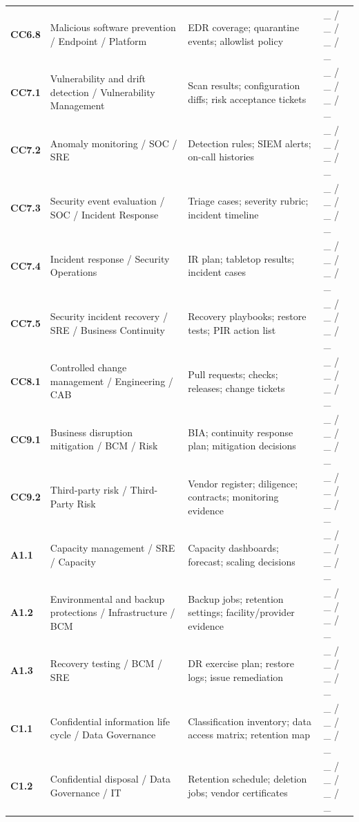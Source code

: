 \documentclass[10pt,oneside]{report}
\begin{document}
\begin{longtable}{@{}p{0.63in}p{2.13in}p{2.28in}p{0.92in}@{}}
\textbf{CC6.8} & Malicious software prevention / Endpoint / Platform & EDR coverage; quarantine events; allowlist policy & \_ / \_ / \_ / \_ \\
\addlinespace[3pt]
\textbf{CC7.1} & Vulnerability and drift detection / Vulnerability Management & Scan results; configuration diffs; risk acceptance tickets & \_ / \_ / \_ / \_ \\
\addlinespace[3pt]
\textbf{CC7.2} & Anomaly monitoring / SOC / SRE & Detection rules; SIEM alerts; on-call histories & \_ / \_ / \_ / \_ \\
\addlinespace[3pt]
\textbf{CC7.3} & Security event evaluation / SOC / Incident Response & Triage cases; severity rubric; incident timeline & \_ / \_ / \_ / \_ \\
\addlinespace[3pt]
\textbf{CC7.4} & Incident response / Security Operations & IR plan; tabletop results; incident cases & \_ / \_ / \_ / \_ \\
\addlinespace[3pt]
\textbf{CC7.5} & Security incident recovery / SRE / Business Continuity & Recovery playbooks; restore tests; PIR action list & \_ / \_ / \_ / \_ \\
\addlinespace[3pt]
\textbf{CC8.1} & Controlled change management / Engineering / CAB & Pull requests; checks; releases; change tickets & \_ / \_ / \_ / \_ \\
\addlinespace[3pt]
\textbf{CC9.1} & Business disruption mitigation / BCM / Risk & BIA; continuity response plan; mitigation decisions & \_ / \_ / \_ / \_ \\
\addlinespace[3pt]
\textbf{CC9.2} & Third-party risk / Third-Party Risk & Vendor register; diligence; contracts; monitoring evidence & \_ / \_ / \_ / \_ \\
\addlinespace[3pt]
\textbf{A1.1} & Capacity management / SRE / Capacity & Capacity dashboards; forecast; scaling decisions & \_ / \_ / \_ / \_ \\
\addlinespace[3pt]
\textbf{A1.2} & Environmental and backup protections / Infrastructure / BCM & Backup jobs; retention settings; facility/provider evidence & \_ / \_ / \_ / \_ \\
\addlinespace[3pt]
\textbf{A1.3} & Recovery testing / BCM / SRE & DR exercise plan; restore logs; issue remediation & \_ / \_ / \_ / \_ \\
\addlinespace[3pt]
\textbf{C1.1} & Confidential information life cycle / Data Governance & Classification inventory; data access matrix; retention map & \_ / \_ / \_ / \_ \\
\addlinespace[3pt]
\textbf{C1.2} & Confidential disposal / Data Governance / IT & Retention schedule; deletion jobs; vendor certificates & \_ / \_ / \_ / \_ \\

\end{longtable}
\end{document}
